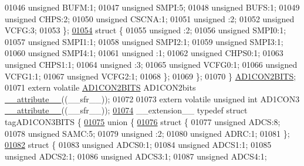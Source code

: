 \begin{DoxyCode}
01046       \textcolor{keywordtype}{unsigned} BUFM:1;
01047       \textcolor{keywordtype}{unsigned} SMPI:5;
01048       \textcolor{keywordtype}{unsigned} BUFS:1;
01049       \textcolor{keywordtype}{unsigned} CHPS:2;
01050       \textcolor{keywordtype}{unsigned} CSCNA:1;
01051       \textcolor{keywordtype}{unsigned} :2;
01052       \textcolor{keywordtype}{unsigned} VCFG:3;
01053     \};
\hypertarget{a00015_source_l01054}{}\hyperlink{a00015}{01054}     \textcolor{keyword}{struct }\{
01055       \textcolor{keywordtype}{unsigned} :2;
01056       \textcolor{keywordtype}{unsigned} SMPI0:1;
01057       \textcolor{keywordtype}{unsigned} SMPI1:1;
01058       \textcolor{keywordtype}{unsigned} SMPI2:1;
01059       \textcolor{keywordtype}{unsigned} SMPI3:1;
01060       \textcolor{keywordtype}{unsigned} SMPI4:1;
01061       \textcolor{keywordtype}{unsigned} :1;
01062       \textcolor{keywordtype}{unsigned} CHPS0:1;
01063       \textcolor{keywordtype}{unsigned} CHPS1:1;
01064       \textcolor{keywordtype}{unsigned} :3;
01065       \textcolor{keywordtype}{unsigned} VCFG0:1;
01066       \textcolor{keywordtype}{unsigned} VCFG1:1;
01067       \textcolor{keywordtype}{unsigned} VCFG2:1;
01068     \};
01069   \};
01070 \} \hyperlink{a00014_da/d2a/a00086}{AD1CON2BITS};
01071 \textcolor{keyword}{extern} \textcolor{keyword}{volatile} \hyperlink{a00014_da/d2a/a00086}{AD1CON2BITS} AD1CON2bits \hyperlink{a00015_a493c46f03454991ccc5aa7a6e1dfb2a7}{\_\_attribute\_\_}((\_\_sfr\_\_));
01072 
01073 \textcolor{keyword}{extern} \textcolor{keyword}{volatile} \textcolor{keywordtype}{unsigned} \textcolor{keywordtype}{int}  AD1CON3 \hyperlink{a00015_a493c46f03454991ccc5aa7a6e1dfb2a7}{\_\_attribute\_\_}((\_\_sfr\_\_));
\hypertarget{a00015_source_l01074}{}\hyperlink{a00014}{01074} \_\_extension\_\_ \textcolor{keyword}{typedef} \textcolor{keyword}{struct }tagAD1CON3BITS \{
\hypertarget{a00015_source_l01075}{}\hyperlink{a00015}{01075}   \textcolor{keyword}{union }\{
\hypertarget{a00015_source_l01076}{}\hyperlink{a00015}{01076}     \textcolor{keyword}{struct }\{
01077       \textcolor{keywordtype}{unsigned} ADCS:8;
01078       \textcolor{keywordtype}{unsigned} SAMC:5;
01079       \textcolor{keywordtype}{unsigned} :2;
01080       \textcolor{keywordtype}{unsigned} ADRC:1;
01081     \};
\hypertarget{a00015_source_l01082}{}\hyperlink{a00015}{01082}     \textcolor{keyword}{struct }\{
01083       \textcolor{keywordtype}{unsigned} ADCS0:1;
01084       \textcolor{keywordtype}{unsigned} ADCS1:1;
01085       \textcolor{keywordtype}{unsigned} ADCS2:1;
01086       \textcolor{keywordtype}{unsigned} ADCS3:1;
01087       \textcolor{keywordtype}{unsigned} ADCS4:1;

\end{DoxyCode}

